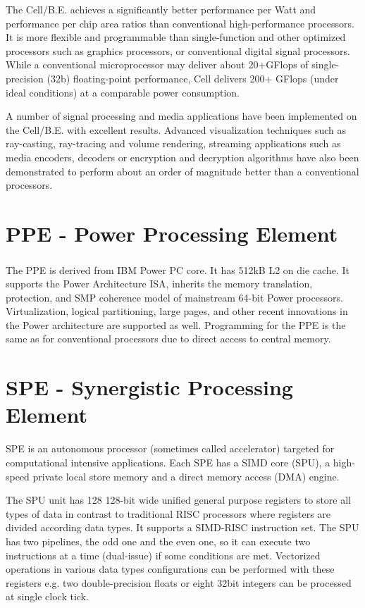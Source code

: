 The \mbox{Cell/B.E.} achieves a significantly better performance per Watt and performance per chip area ratios than conventional high-performance processors.
It is more flexible and programmable than single-function and other optimized processors such as graphics processors, or conventional digital signal processors.
While a conventional microprocessor may deliver about 20+GFlops of single-precision (32b) floating-point performance, Cell delivers 200+ GFlops (under ideal conditions) at a comparable power consumption.

A number of signal processing and media applications have been implemented on the \mbox{Cell/B.E.} with excellent results.
Advanced visualization techniques such as ray-casting, ray-tracing and volume rendering, streaming applications such as media encoders, decoders or encryption and decryption algorithms have also been demonstrated to perform about an order of magnitude better than a conventional processors.


\section{PPE - Power Processing Element}

The PPE is derived from IBM Power PC\textsuperscript{\textregistered} core. It has 512kB L2 on die cache.
It supports the Power Architecture ISA, inherits the memory translation, protection, and SMP coherence model of mainstream 64-bit Power processors.
Virtualization, logical partitioning, large pages, and other recent innovations in the Power architecture are supported as well.
Programming for the PPE is the same as for conventional processors due to direct access to central memory.

\section{SPE - Synergistic Processing Element}

\par
SPE is an autonomous processor (sometimes called accelerator) targeted for computational intensive applications.
Each SPE has a SIMD core (SPU), a high-speed private local store memory and a direct memory access (DMA) engine.

\par
The SPU unit has 128 128-bit wide unified general purpose registers to store all types of data in contrast to traditional RISC processors where registers are divided according data types.
It supports a SIMD-RISC instruction set.
The SPU has two pipelines, the odd one and the even one, so it can execute two instructions at a time (dual-issue) if some conditions are met.
Vectorized operations in various data types configurations can be performed with these registers e.g. two double-precision floats or eight 32bit integers can be processed at single clock tick.

